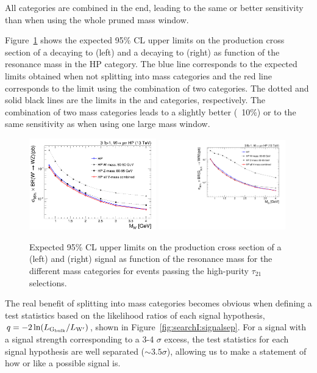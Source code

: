  

 All categories are combined in the end, leading to the same or better sensitivity than when using the whole pruned mass window. 

Figure~\ref{fig:searchI:massCategories} shows the expected 95\% CL upper limits on the production cross section of a \PWpr decaying to \WZ (left) and a \BulkG decaying to \WW (right) as function of the resonance mass in the HP category. The blue line corresponds to the expected limits obtained when not splitting into mass categories and the red line corresponds to the limit using the combination of two categories. The dotted and solid black lines are the limits in the \PW and \PZ categories, respectively. The combination of two mass categories leads to a slightly better (~10\%) or to the same sensitivity as when using one large mass window.

\begin{figure}[h!p]
 \centering
 \includegraphics[width=0.49\textwidth]{figures/analysis/search1/AN-15-196/massCategories/compare-HP-HPV-Wprime.png}
  \includegraphics[width=0.49\textwidth]{figures/analysis/search1/AN-15-196/massCategories/compare-HP-HPV-BulkG.pdf}
 \caption{Expected 95\% CL upper limits on the production cross section of a \PWpr (left) and \BulkG (right) signal as function of the resonance mass for the different mass categories for events passing the high-purity $\tau_{21}$ selections.}
 \label{fig:searchI:massCategories}
 \end{figure}

The real benefit of splitting into mass categories becomes obvious when defining a test statistics based on the likelihood ratios of each signal hypothesis, $q = -2 \ln(L_{\mathrm{G}_\mathrm{bulk}}/L_{\mathrm{W}^\prime})$, shown in Figure~\ref{fig:searchI:signalsep}. For a signal with a signal strength corresponding to a 3-4 $\sigma$ excess, the test statistics for each signal hypothesis are well separated ($\sim3.5 \sigma$), allowing us to make a statement of how \BulkG or \PWpr like a possible signal is.

